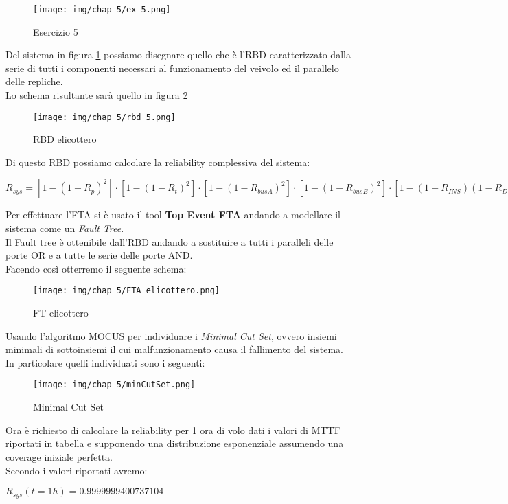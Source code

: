 \begin{figure}[H]
    \centering
    \texttt{[image: img/chap\_5/ex\_5.png]}
    \caption{Esercizio 5}
    \label{fig:ex_5}
\end{figure}
\noindent
Del sistema in figura \ref{fig:ex_5} possiamo disegnare quello che è l'RBD caratterizzato dalla serie di tutti i componenti necessari al funzionamento del veivolo ed il parallelo delle repliche.\\
Lo schema risultante sarà quello in figura \ref{fig:rbd_5}
\begin{figure}[H]
    \centering
    \texttt{[image: img/chap\_5/rbd\_5.png]}
    \caption{RBD elicottero}
    \label{fig:rbd_5}
\end{figure}
\noindent
Di questo RBD possiamo calcolare la reliability complessiva del sistema:
\begin{center}
    $
    R_{sys} = [1-(1-R_p)^2] \cdot [1-(1-R_t)^2] \cdot [1-(1-R_{busA})^2] \cdot [1-(1-R_{busB})^2] \cdot [1-(1-R_{INS})(1-R_D)(1-(1-R_{AHRS})^3]
    $
\end{center}
Per effettuare l'FTA si è usato il tool \textbf{Top Event FTA} andando a modellare il sistema come un \textit{Fault Tree}.\\
Il Fault tree è ottenibile dall'RBD andando a sostituire a tutti i paralleli delle porte OR e a tutte le serie delle porte AND.\\
Facendo così otterremo il seguente schema:
\begin{figure}[H]
    \centering
    \texttt{[image: img/chap\_5/FTA\_elicottero.png]}
    \caption{FT elicottero}
    \label{fig:ft_elicottero}
\end{figure}
\noindent
Usando l'algoritmo MOCUS per individuare i \textit{Minimal Cut Set}, ovvero insiemi minimali di sottoinsiemi il cui malfunzionamento causa il fallimento del sistema.\\
In particolare quelli individuati sono i seguenti:
\begin{figure}[H]
    \centering
    \texttt{[image: img/chap\_5/minCutSet.png]}
    \caption{Minimal Cut Set}
    \label{fig:cutSet}
\end{figure}
\noindent
Ora è richiesto di calcolare la reliability per 1 ora di volo dati i valori di MTTF riportati in tabella e supponendo una distribuzione esponenziale assumendo una coverage iniziale perfetta.\\
Secondo i valori riportati avremo:
\begin{center}
    $
    R_{sys}(t=1h) = 0.9999999400737104
    $
\end{center}
